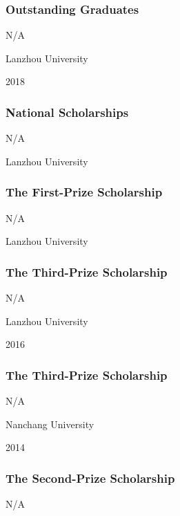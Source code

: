 \documentclass[
]{article}
\begin{document}
\hypertarget{outstanding-graduates}{%
\subsubsection{Outstanding Graduates}\label{outstanding-graduates}}

N/A

Lanzhou University

2018

\hypertarget{national-scholarships}{%
\subsubsection{National Scholarships}\label{national-scholarships}}

N/A

Lanzhou University

\hypertarget{the-first-prize-scholarship}{%
\subsubsection{The First-Prize
Scholarship}\label{the-first-prize-scholarship}}

N/A

Lanzhou University

\hypertarget{the-third-prize-scholarship}{%
\subsubsection{The Third-Prize
Scholarship}\label{the-third-prize-scholarship}}

N/A

Lanzhou University

2016

\hypertarget{the-third-prize-scholarship-1}{%
\subsubsection{The Third-Prize
Scholarship}\label{the-third-prize-scholarship-1}}

N/A

Nanchang University

2014

\hypertarget{the-second-prize-scholarship}{%
\subsubsection{The Second-Prize
Scholarship}\label{the-second-prize-scholarship}}

N/A
\end{document}
